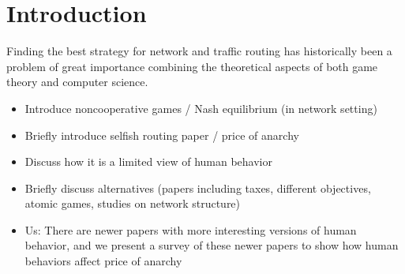 \section{Introduction}
Finding the best strategy for network and traffic routing has historically been a problem of great importance combining the theoretical aspects of both game theory and computer science. 
\begin{itemize}
    \item Introduce noncooperative games / Nash equilibrium (in network setting)
    \item Briefly introduce selfish routing paper / price of anarchy
    \item Discuss how it is a limited view of human behavior
    \item Briefly discuss alternatives (papers including taxes, different objectives, atomic games, studies on network structure)
    \item Us: There are newer papers with more interesting versions of human behavior, and we present a survey of these newer papers to show how human behaviors affect price of anarchy
\end{itemize}
